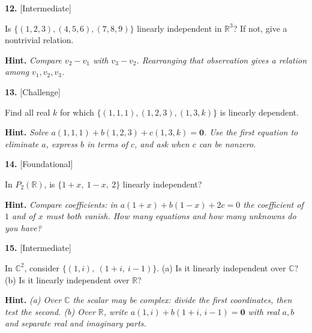 \documentclass[11pt]{article}
\begin{document}
\begin{minipage}{\linewidth}\textbf{12.} \hfill{\scriptsize\color{ink}[Intermediate]}\par\nopagebreak Is $\{(1,2,3),(4,5,6),(7,8,9)\}$ linearly independent in $\mathbb{R}^{3}$? If not, give a nontrivial relation.
\par\smallskip\begingroup\small\color{ink}\textbf{Hint.} \textit{Compare $v_2-v_1$ with $v_3-v_2$. Rearranging that observation gives a relation among $v_1,v_2,v_3$.}\endgroup
\vspace{4.0cm}\end{minipage}\par\vspace{4pt}
\begin{minipage}{\linewidth}\textbf{13.} \hfill{\scriptsize\color{ink}[Challenge]}\par\nopagebreak Find all real $k$ for which $\{(1,1,1),(1,2,3),(1,3,k)\}$ is linearly dependent.
\par\smallskip\begingroup\small\color{ink}\textbf{Hint.} \textit{Solve $a(1,1,1)+b(1,2,3)+c(1,3,k)=\mathbf 0$. Use the first equation to eliminate $a$, express $b$ in terms of $c$, and ask when $c$ can be nonzero.}\endgroup
\vspace{4.6cm}\end{minipage}\par\vspace{4pt}
\begin{minipage}{\linewidth}\textbf{14.} \hfill{\scriptsize\color{ink}[Foundational]}\par\nopagebreak In $P_{2}(\mathbb{R})$, is $\{1+x,\ 1-x,\ 2\}$ linearly independent?
\par\smallskip\begingroup\small\color{ink}\textbf{Hint.} \textit{Compare coefficients: in $a(1+x)+b(1-x)+2c=0$ the coefficient of $1$ and of $x$ must both vanish. How many equations and how many unknowns do you have?}\endgroup
\vspace{3.0cm}\end{minipage}\par\vspace{4pt}
\begin{minipage}{\linewidth}\textbf{15.} \hfill{\scriptsize\color{ink}[Intermediate]}\par\nopagebreak In $\mathbb{C}^{2}$, consider $\{(1,i),\ (1+i,\ i-1)\}$. (a) Is it linearly independent over $\mathbb{C}$? (b) Is it linearly independent over $\mathbb{R}$?
\par\smallskip\begingroup\small\color{ink}\textbf{Hint.} \textit{(a) Over $\mathbb{C}$ the scalar may be complex: divide the first coordinates, then test the second. (b) Over $\mathbb{R}$, write $a(1,i)+b(1+i,\,i-1)=\mathbf 0$ with real $a,b$ and separate real and imaginary parts.}\endgroup
\vspace{5.0cm}\end{minipage}\par\vspace{4pt}
\end{document}
